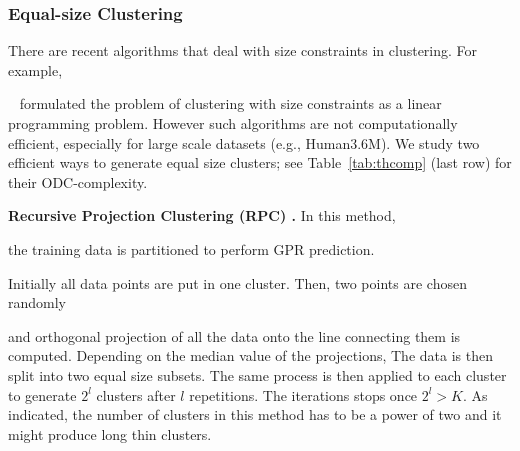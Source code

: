\vspace{-1.5mm}
\subsubsection{Equal-size Clustering}

 There are recent algorithms that deal with size constraints in clustering. For example,~\cite{Zhu2010} formulated the problem of clustering with size constraints as a linear programming problem. However such algorithms are not computationally efficient, especially for large scale datasets (e.g., Human3.6M). We study two efficient ways to generate equal size clusters; see Table~\ref{tab:thcomp} (last row) for their ODC-complexity.

\vspace{2mm}

\noindent \textbf{Recursive Projection Clustering (RPC) \cite{Chalupka:2013}.}
In this method, the training data is partitioned to perform GPR prediction.  Initially all  data points are put in one cluster. Then, two points are chosen randomly and orthogonal projection of all the data onto the line connecting them is computed. Depending on the median value of the projections, The data is then split into two equal size subsets. The same process is then applied to each cluster to generate $2^l$ clusters after $l$ repetitions. The iterations stops once $2^l>K$. As indicated, the number of clusters in this method has to be a power of two and it might produce long thin clusters. 



\vspace{2mm}

